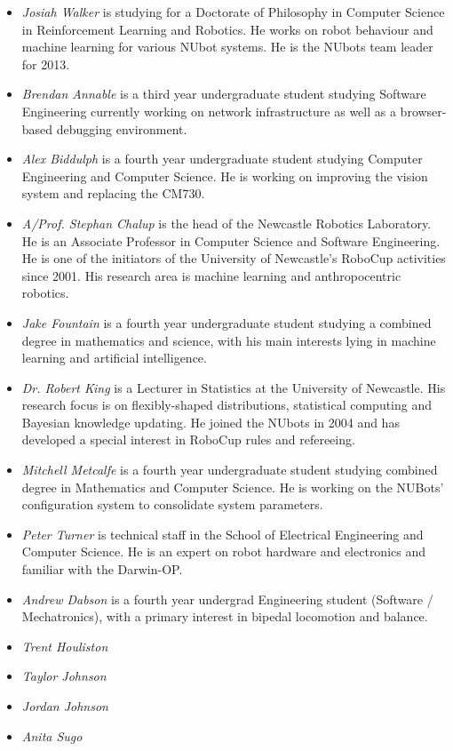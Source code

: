 \documentclass{llncs}
\begin{document}
\begin{itemize}
\item \emph{Josiah Walker} is studying for a Doctorate of Philosophy in Computer Science in Reinforcement Learning and Robotics. He works on robot behaviour and machine learning for various NUbot systems. He is the NUbots team leader for 2013.




\item \emph{Brendan Annable} is a third year undergraduate student studying Software Engineering currently working on network infrastructure as well as a browser-based debugging environment.

\item \emph{Alex Biddulph} is a fourth year undergraduate student studying Computer Engineering and Computer Science. He is working on improving the vision system and replacing the CM730.

\item \emph{A/Prof. Stephan Chalup} is the head of the Newcastle Robotics
Laboratory. He is an Associate Professor in Computer Science and Software Engineering.
He is one of the initiators of the University of Newcastle's
RoboCup activities since 2001. His research area is machine learning
and anthropocentric robotics.

\item \emph{Jake Fountain} is a fourth year undergraduate student studying a combined degree in mathematics and science, with his main interests lying in machine learning and artificial intelligence.

\item \emph{Dr. Robert King} is a Lecturer in Statistics at the University of Newcastle. His research focus is on flexibly-shaped distributions,
statistical computing and Bayesian knowledge updating. He joined the
NUbots in 2004 and has developed a special interest in RoboCup rules and refereeing.

\item \emph{Mitchell Metcalfe} is a fourth year undergraduate student studying combined degree in Mathematics and Computer Science. He is working on the NUBots' configuration system to consolidate system parameters.

\item \emph{Peter Turner} is technical staff in the School of Electrical Engineering and Computer Science. He is an expert on robot hardware and electronics and familiar with the Darwin-OP.

\item \emph{Andrew Dabson} is a fourth year undergrad Engineering student (Software / Mechatronics), with a primary interest in bipedal locomotion and balance.

\item \emph{Trent Houliston} 

\item \emph{Taylor Johnson} 

\item \emph{Jordan Johnson} 

\item \emph{Anita Sugo} 

\end{itemize}
\end{document}
